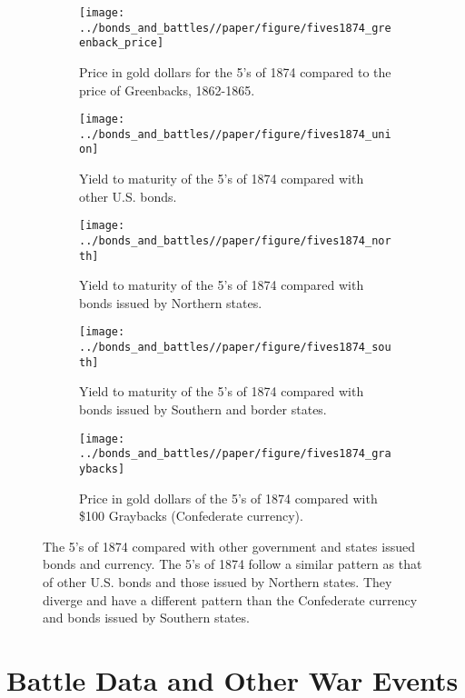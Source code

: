 \begin{figure}[!]
  \begin{subfigure}[b]{0.45\linewidth}
    \texttt{[image: ../bonds\_and\_battles//paper/figure/fives1874\_greenback\_price]}
  \caption{Price in gold dollars for the 5's of 1874 compared to the price of Greenbacks, 1862-1865.}
  \label{fig:fives1874_greenbacks}
\end{subfigure}%
\hspace{0.1\linewidth}%
\begin{subfigure}[b]{0.45\linewidth}
    \texttt{[image: ../bonds\_and\_battles//paper/figure/fives1874\_union]}
  \caption{Yield to maturity of the 5's of 1874 compared with other U.S. bonds.}
  \label{fig:fives1874_union}
\end{subfigure}

\begin{subfigure}[b]{0.45\linewidth}
  \centering
  \texttt{[image: ../bonds\_and\_battles//paper/figure/fives1874\_north]}
\caption{Yield to maturity of the 5's of 1874 compared with bonds issued by Northern states.}
\label{fig:fives1874_north}
\end{subfigure}%
\hspace{0.1\linewidth}%
\begin{subfigure}[b]{0.45\linewidth}
  \texttt{[image: ../bonds\_and\_battles//paper/figure/fives1874\_south]}
\caption{Yield to maturity of the 5's of 1874 compared with bonds issued by Southern and border states.}
\label{fig:fives1874_south}
\end{subfigure}

\begin{subfigure}[b]{0.45\linewidth}
  \texttt{[image: ../bonds\_and\_battles//paper/figure/fives1874\_graybacks]}
\caption{Price in gold dollars of the 5's of 1874 compared with \$100 Graybacks (Confederate currency).}
\label{fig:fives1874_grayback}

\end{subfigure}
\caption[The 5's of 1874 compared with other government and states issued bonds and currency.]{The 5's of 1874 compared with other government and states issued bonds and currency.
  The 5's of 1874 follow a similar pattern as that of other U.S. bonds and those issued by Northern states.
  They diverge and have a different pattern than the Confederate currency and bonds issued by Southern states.
}
\label{fig:fives1874_compared}
\end{figure}



\section{Battle Data and Other War Events}
\label{sec:battle-data}

